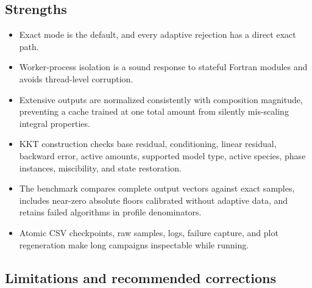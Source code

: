 \documentclass[11pt]{article}
\begin{document}
\subsection{Strengths}

\begin{itemize}[leftmargin=*]
  \item Exact mode is the default, and every adaptive rejection has a direct exact path.
  \item Worker-process isolation is a sound response to stateful Fortran modules and avoids
  thread-level corruption.
  \item Extensive outputs are normalized consistently with composition magnitude, preventing a
  cache trained at one total amount from silently mis-scaling integral properties.
  \item KKT construction checks base residual, conditioning, linear residual, backward error,
  active amounts, supported model type, active species, phase instances, miscibility, and state
  restoration.
  \item The benchmark compares complete output vectors against exact samples, includes near-zero
  absolute floors calibrated without adaptive data, and retains failed algorithms in profile
  denominators.
  \item Atomic CSV checkpoints, raw samples, logs, failure capture, and plot regeneration make long
  campaigns inspectable while running.
\end{itemize}

\subsection{Limitations and recommended corrections}
\end{document}
